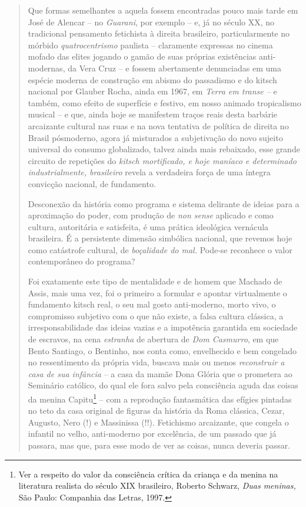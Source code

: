 \begin{quote}
Que formas semelhantes a aquela fossem encontradas pouco mais tarde em
José de Alencar -- no \emph{Guarani}, por exemplo -- e, já no século XX,
no tradicional pensamento fetichista à direita brasileiro,
particularmente no mórbido \emph{quatrocentrismo} paulista -- claramente
expressas no cinema mofado das elites jogando o gamão de suas próprias
existências anti-modernas, da Vera Cruz -- e fossem abertamente
denunciadas em uma espécie moderna de construção em abismo do passadismo
e do kitsch nacional por Glauber Rocha, ainda em 1967, em \emph{Terra em
transe --} e também, como efeito de superfície e festivo, em nosso
animado tropicalismo musical -- e que, ainda hoje se manifestem traços
reais desta barbárie arcaizante cultural nas ruas e na nova tentativa de
política de direita no Brasil pósmoderno, agora já misturados a
subjetivação do novo sujeito universal do consumo globalizado, talvez
ainda mais rebaixado, esse grande circuito de repetições do \emph{kitsch
mortificado, e hoje maníaco e determinado industrialmente, brasileiro}
revela a verdadeira força de uma íntegra convicção nacional, de
fundamento.

Desconexão da história como programa e sistema delirante de ideias para
a aproximação do poder, com produção de \emph{non sense} aplicado e como
cultura, autoritária e satisfeita, é uma prática ideológica vernácula
brasileira. É a persistente dimensão simbólica nacional, que revemos
hoje como catástrofe cultural, de \emph{boçalidade do mal.} Pode-se
reconhece o valor contemporâneo do programa?

Foi exatamente este tipo de mentalidade e de homem que Machado de Assis,
mais uma vez, foi o primeiro a formular e apontar virtualmente o
fundamento kitsch real, o seu mal gosto anti-moderno, morto vivo, o
compromisso subjetivo com o que não existe, a falsa cultura clássica, a
irresponsabilidade das ideias vazias e a impotência garantida em
sociedade de escravos, na cena \emph{estranha} de abertura de \emph{Dom
Casmurro}, em que Bento Santiago, o Bentinho, nos conta como,
envelhecido e bem congelado no ressentimento da própria vida, buscava
mais ou menos \emph{reconstruir a casa de sua infância} -- a casa da
mamãe Dona Glória que o prometera ao Seminário católico, do qual ele
fora salvo pela consciência aguda das coisas da menina Capitu\footnote{Ver
  a respeito do valor da consciência crítica da criança e da menina na
  literatura realista do século XIX brasileiro, Roberto Schwarz,
  \emph{Duas meninas,} São Paulo: Companhia das Letras, 1997.} -- com a
reprodução fantasmática das efígies pintadas no teto da casa original de
figuras da história da Roma clássica, Cezar, Augusto, Nero (!) e
Massinissa (!!). Fetichismo arcaizante, que congela o infantil no velho,
anti-moderno por excelência, de um passado que já passara, mas que, para
esse modo de ver as coisas, nunca deveria passar.


\end{quote}
